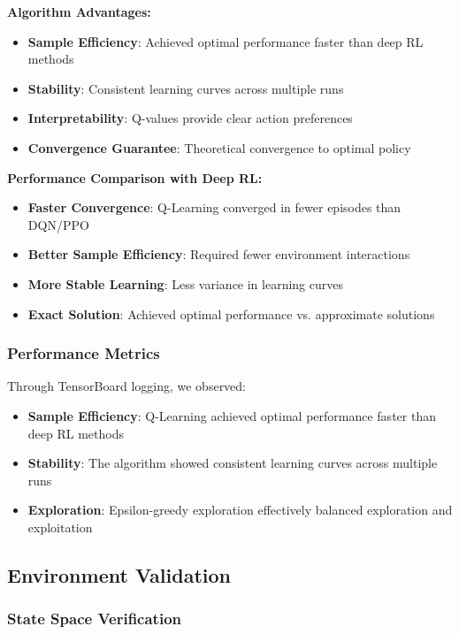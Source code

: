 \documentclass[12pt]{article}
\begin{document}
{{{\textbf{Algorithm Advantages:}
\begin{itemize}
    \item \textbf{Sample Efficiency}: Achieved optimal performance faster than deep RL methods
    \item \textbf{Stability}: Consistent learning curves across multiple runs
    \item \textbf{Interpretability}: Q-values provide clear action preferences
    \item \textbf{Convergence Guarantee}: Theoretical convergence to optimal policy
\end{itemize}

\textbf{Performance Comparison with Deep RL:}
\begin{itemize}
    \item \textbf{Faster Convergence}: Q-Learning converged in fewer episodes than DQN/PPO
    \item \textbf{Better Sample Efficiency}: Required fewer environment interactions
    \item \textbf{More Stable Learning}: Less variance in learning curves
    \item \textbf{Exact Solution}: Achieved optimal performance vs. approximate solutions
\end{itemize}

\subsubsection{Performance Metrics}

Through TensorBoard logging, we observed:

\begin{itemize}
    \item \textbf{Sample Efficiency}: Q-Learning achieved optimal performance faster than deep RL methods
    \item \textbf{Stability}: The algorithm showed consistent learning curves across multiple runs
    \item \textbf{Exploration}: Epsilon-greedy exploration effectively balanced exploration and exploitation
\end{itemize}

\subsection{Environment Validation}

\subsubsection{State Space Verification}

}}}
\end{document}
